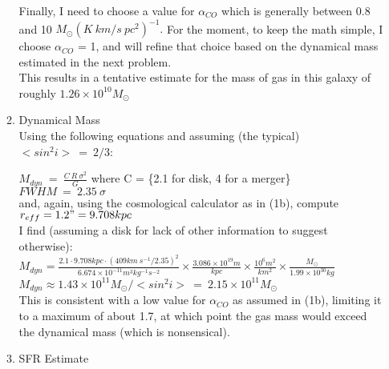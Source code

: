 \documentclass[11pt]{article}
\begin{document}
\begin{enumerate}
\begin{enumerate}
	Finally, I need to choose a value for $\alpha_{CO}$ which is generally between 0.8 and 10 $M_{\odot} (K\ km/s\ pc^2)^{-1}.$ For the moment, to keep the math simple, I choose $\alpha_{CO}$ = 1, and will refine that choice based on the dynamical mass estimated in the next problem. \\
	
	This results in a tentative estimate for the mass of gas in this galaxy of roughly $1.26 \times 10^{10} M_{\odot}$\\
	
	
	
	
	
	\item Dynamical Mass%
	\\

	Using the following equations and assuming (the typical) $<sin^2i>\ =\ 2/3$:
	
	\hspace{10mm} $M_{dyn}\ =\ \frac{\displaystyle C\ R\ \sigma^2}{\displaystyle  G} $ where C = \{2.1 for disk, 4 for a merger\} \\
	
	\hspace{10mm} $FWHM\ =\ 2.35\ \sigma$\\
	
	and, again, using the cosmological calculator as in (1b), compute $r_{eff} = 1.2" = 9.708 kpc$\\
	
	I find (assuming a disk for lack of other information to suggest otherwise):\\
	
	 $M_{dyn} = \frac{\displaystyle 2.1 \cdot 9.708 kpc \cdot (409km\ s^{-1}/2.35)^2}{\displaystyle 6.674 \times 10^{-11} m^3 kg^{-1} s^{-2}} \times \frac{\displaystyle 3.086\times 10^{19} m}{\displaystyle kpc} \times \frac{\displaystyle 10^{6} m^2}{\displaystyle km^2} \times \frac{\displaystyle M_{\odot}}{\displaystyle 1.99 \times 10^{30} kg} $\\
	 
	 $M_{dyn} \approx 1.43 \times 10^{11} M_{\odot} / < sin^2i >\ =\ 2.15 \times 10^{11} M_{\odot}$\\
	 
	 This is consistent with a low value for $\alpha_{CO}$ as assumed in (1b), limiting it to a maximum of about 1.7, at which point the gas mass would exceed the dynamical mass (which is nonsensical).\\
	 
	 
	 
	 
	 
	 \item SFR Estimate %
	
 
   \end{enumerate}

\end{enumerate}
\end{document}

